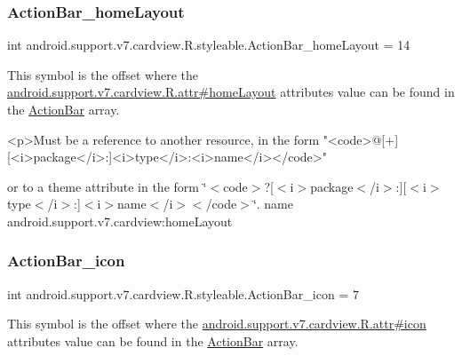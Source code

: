 \subsubsection{\texorpdfstring{Action\+Bar\+\_\+home\+Layout}{ActionBar\_homeLayout}}
{\footnotesize\ttfamily int android.\+support.\+v7.\+cardview.\+R.\+styleable.\+Action\+Bar\+\_\+home\+Layout = 14\hspace{0.3cm}{\ttfamily [static]}}

This symbol is the offset where the \hyperlink{classandroid_1_1support_1_1v7_1_1cardview_1_1R_1_1attr_a0576ee185b32fbfd1a3a5cb94886e8d3}{android.\+support.\+v7.\+cardview.\+R.\+attr\#home\+Layout} attribute\textquotesingle{}s value can be found in the \hyperlink{classandroid_1_1support_1_1v7_1_1cardview_1_1R_1_1styleable_a0cbf7f776e31f78bb0a2b558daf176f8}{Action\+Bar} array.

\begin{DoxyVerb}      <p>Must be a reference to another resource, in the form "<code>@[+][<i>package</i>:]<i>type</i>:<i>name</i></code>"
\end{DoxyVerb}
 or to a theme attribute in the form \char`\"{}$<$code$>$?\mbox{[}$<$i$>$package$<$/i$>$\+:\mbox{]}\mbox{[}$<$i$>$type$<$/i$>$\+:\mbox{]}$<$i$>$name$<$/i$>$$<$/code$>$\char`\"{}.  name android.\+support.\+v7.\+cardview\+:home\+Layout \mbox{\label{classandroid_1_1support_1_1v7_1_1cardview_1_1R_1_1styleable_a788c4261e4e2b4b27f71511aa0b5ecba}} 
\subsubsection{\texorpdfstring{Action\+Bar\+\_\+icon}{ActionBar\_icon}}
{\footnotesize\ttfamily int android.\+support.\+v7.\+cardview.\+R.\+styleable.\+Action\+Bar\+\_\+icon = 7\hspace{0.3cm}{\ttfamily [static]}}

This symbol is the offset where the \hyperlink{classandroid_1_1support_1_1v7_1_1cardview_1_1R_1_1attr_a9d627427d4722257934c98eb559831e1}{android.\+support.\+v7.\+cardview.\+R.\+attr\#icon} attribute\textquotesingle{}s value can be found in the \hyperlink{classandroid_1_1support_1_1v7_1_1cardview_1_1R_1_1styleable_a0cbf7f776e31f78bb0a2b558daf176f8}{Action\+Bar} array.

